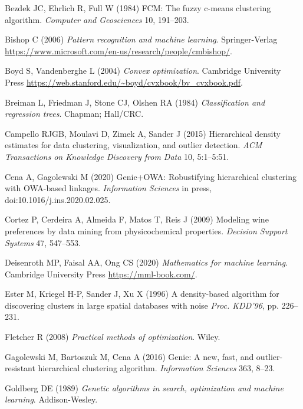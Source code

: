 \documentclass[10pt,b5paper,krantz1]{krantz}
\begin{document}
\hypertarget{refs}{}
\leavevmode\hypertarget{ref-cmeans}{}%
Bezdek JC, Ehrlich R, Full W (1984) FCM: The fuzzy c-means clustering algorithm. \emph{Computer and Geosciences} 10, 191--203.

\leavevmode\hypertarget{ref-bishop}{}%
Bishop C (2006) \emph{Pattern recognition and machine learning}. Springer-Verlag \url{https://www.microsoft.com/en-us/research/people/cmbishop/}.

\leavevmode\hypertarget{ref-boyd_vandenberghe}{}%
Boyd S, Vandenberghe L (2004) \emph{Convex optimization}. Cambridge University Press \url{https://web.stanford.edu/~boyd/cvxbook/bv_cvxbook.pdf}.

\leavevmode\hypertarget{ref-cart}{}%
Breiman L, Friedman J, Stone CJ, Olshen RA (1984) \emph{Classification and regression trees}. Chapman; Hall/CRC.

\leavevmode\hypertarget{ref-hdbscan}{}%
Campello RJGB, Moulavi D, Zimek A, Sander J (2015) Hierarchical density estimates for data clustering, visualization, and outlier detection. \emph{ACM Transactions on Knowledge Discovery from Data} 10, 5:1--5:51.

\leavevmode\hypertarget{ref-genieowa}{}%
Cena A, Gagolewski M (2020) Genie+OWA: Robustifying hierarchical clustering with OWA-based linkages. \emph{Information Sciences} in press, doi:10.1016/j.ins.2020.02.025.

\leavevmode\hypertarget{ref-wines}{}%
Cortez P, Cerdeira A, Almeida F, Matos T, Reis J (2009) Modeling wine preferences by data mining from physicochemical properties. \emph{Decision Support Systems} 47, 547--553.

\leavevmode\hypertarget{ref-mml}{}%
Deisenroth MP, Faisal AA, Ong CS (2020) \emph{Mathematics for machine learning}. Cambridge University Press \url{https://mml-book.com/}.

\leavevmode\hypertarget{ref-dbscan}{}%
Ester M, Kriegel H-P, Sander J, Xu X (1996) A density-based algorithm for discovering clusters in large spatial databases with noise \emph{Proc. KDD'96}, pp. 226--231.

\leavevmode\hypertarget{ref-fletcher}{}%
Fletcher R (2008) \emph{Practical methods of optimization}. Wiley.

\leavevmode\hypertarget{ref-genie}{}%
Gagolewski M, Bartoszuk M, Cena A (2016) Genie: A new, fast, and outlier-resistant hierarchical clustering algorithm. \emph{Information Sciences} 363, 8--23.

\leavevmode\hypertarget{ref-genetic}{}%
Goldberg DE (1989) \emph{Genetic algorithms in search, optimization and machine learning}. Addison-Wesley.
\end{document}
